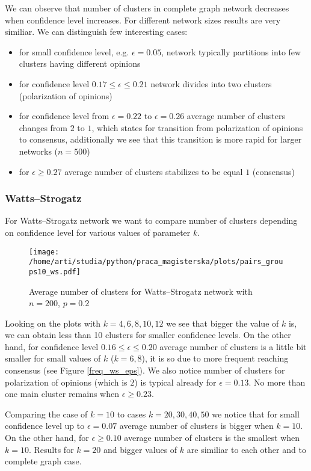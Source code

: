 \documentclass{article}
\begin{document}
We can observe that number of clusters in complete graph network decreases when confidence level increases. For different network sizes results are very similiar. We can distinguish few interesting cases:
\begin{itemize}
\item for small confidence level, e.g. $\epsilon = 0.05$, network typically partitions into few clusters having different opinions
\item for confidence level $0.17 \leq \epsilon \leq 0.21$ network divides into two clusters (polarization of opinions)
\item for confidence level from $\epsilon = 0.22$ to $\epsilon = 0.26$ average number of clusters changes from $2$ to $1$, which states for transition from polarization of opinions to consensus, additionally we see that this transition is more rapid for larger networks ($n=500$)
\item for $\epsilon \geq 0.27$ average number of clusters stabilizes to be equal $1$ (consensus)
\end{itemize} 

\subsubsection{Watts--Strogatz}

For Watts--Strogatz network we want to compare number of clusters depending on confidence level for various values of parameter $k$.

\begin{figure}[H]
		\centering
		\texttt{[image: /home/arti/studia/python/praca\_magisterska/plots/pairs\_groups10\_ws.pdf]}
		\caption{Average number of clusters for Watts--Strogatz network with $n=200$, $p=0.2$}
\end{figure}

Looking on the plots with $k=4,6,8,10,12$ we see that bigger the value of $k$ is, we can obtain less than 10 clusters for smaller confidence levels. On the other hand, for confidence level $0.16 \leq \epsilon \leq 0.20$ average number of clusters is a little bit smaller for small values of $k$ ($k=6,8$), it is so due to more frequent reaching consensus (see Figure \ref{freq_ws_eps}). We also notice number of clusters for polarization of opinions (which is $2$) is typical already for $\epsilon=0.13$. No more than one main cluster remains when $\epsilon \geq 0.23$.
\indent

Comparing the case of $k=10$ to cases $k=20,30,40,50$ we notice that for small confidence level up to $\epsilon=0.07$ average number of clusters is bigger when $k=10$. On the other hand, for $\epsilon \geq 0.10$ average number of clusters is the smallest when $k=10$. Results for $k=20$ and bigger values of $k$ are similiar to each other and to complete graph case.
\end{document}
